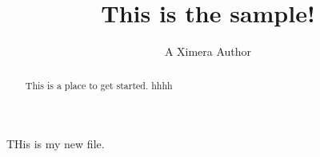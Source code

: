 \documentclass[handout]{ximera}
\title{This is the sample!}
\author{A Ximera Author}
\begin{document}
\begin{abstract}
  This is a place to get started. hhhh
\end{abstract}
\maketitle

THis is my new file.
\end{document}
